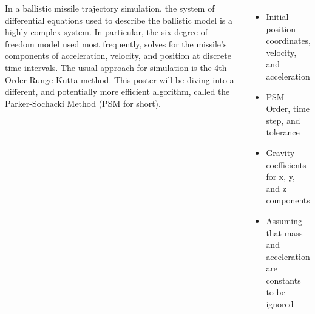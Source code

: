 \documentclass[25pt, a0paper, portrait]{tikzposter}
\begin{document}
\begin{columns}
    {
        In a ballistic missile trajectory simulation, the system of differential equations used to describe the 
        ballistic model is a highly complex system. In particular, the six-degree of freedom model
        used most frequently, solves for the missile's components of acceleration, velocity, and 
        position at discrete time intervals. The usual approach for simulation is the 4th Order 
        Runge Kutta method. This poster will be diving into a different, and potentially more 
        efficient algorithm, called the Parker-Sochacki Method (PSM for short).
    }
    {           
        \begin{itemize}
            \item Initial position coordinates, velocity, and acceleration 
            \item PSM Order, time step, and tolerance 
            \item Gravity coefficients for x, y, and z components
            \item Assuming that mass and acceleration are constants to be ignored
        \end{itemize}
        \vspace{.3cm}
    }
\end{columns}
\end{document}
